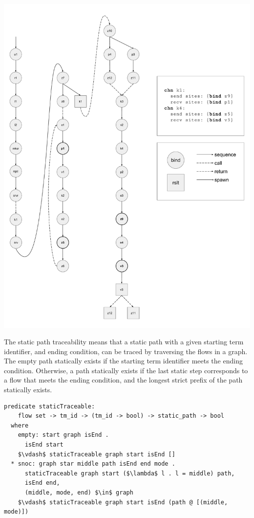 \documentclass[letterpaper, 11pt]{report}
\begin{document}
\includegraphics[width=.9\textwidth]{cml-graph.pdf}

The static path traceability means that a static path with a given starting term identifier, and ending
condition, can be traced by traversing the flows in a graph.
The empty path statically exists if the starting term identifier meets the ending condition.
Otherwise, a path statically exists if the last static step corresponds to a flow
that meets the ending condition, and the longest strict prefix of the path statically
exists. 

\begin{lstlisting}[language=logic, mathescape]
  predicate staticTraceable:
    flow set -> tm_id -> (tm_id -> bool) -> static_path -> bool
  where
    empty: start graph isEnd .
      isEnd start
    $\vdash$ staticTraceable graph start isEnd []
  * snoc: graph star middle path isEnd end mode .
      staticTraceable graph start ($\lambda$ l . l = middle) path, 
      isEnd end, 
      (middle, mode, end) $\in$ graph 
    $\vdash$ staticTraceable graph start isEnd (path @ [(middle, mode)])
\end{lstlisting}
\end{document}
